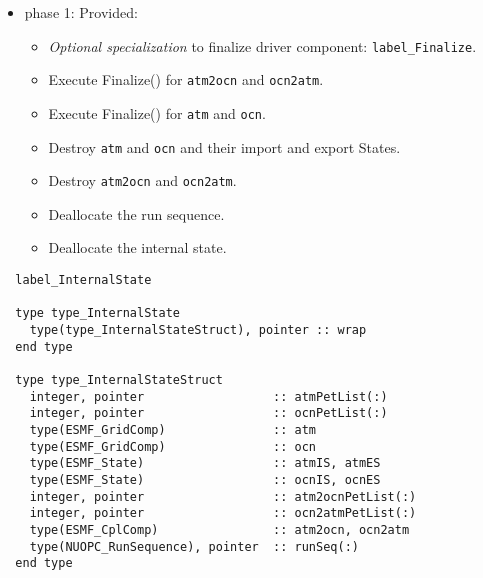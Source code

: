 \begin{itemize}
\item phase 1: {\sc Provided:}
  \begin{itemize}
  \item {\it Optional specialization} to finalize driver component: {\tt label\_Finalize}.
  \item Execute Finalize() for {\tt atm2ocn} and {\tt ocn2atm}.
  \item Execute Finalize() for {\tt atm} and {\tt ocn}.
  \item Destroy {\tt atm} and {\tt ocn} and their import and export States.
  \item Destroy {\tt atm2ocn} and {\tt ocn2atm}.
  \item Deallocate the run sequence.
  \item Deallocate the internal state.
  \end{itemize}      
\end{itemize}

\begin{verbatim}  label_InternalState

  type type_InternalState
    type(type_InternalStateStruct), pointer :: wrap
  end type

  type type_InternalStateStruct
    integer, pointer                  :: atmPetList(:)
    integer, pointer                  :: ocnPetList(:)
    type(ESMF_GridComp)               :: atm
    type(ESMF_GridComp)               :: ocn
    type(ESMF_State)                  :: atmIS, atmES
    type(ESMF_State)                  :: ocnIS, ocnES
    integer, pointer                  :: atm2ocnPetList(:)
    integer, pointer                  :: ocn2atmPetList(:)
    type(ESMF_CplComp)                :: atm2ocn, ocn2atm
    type(NUOPC_RunSequence), pointer  :: runSeq(:)
  end type

\end{verbatim}


